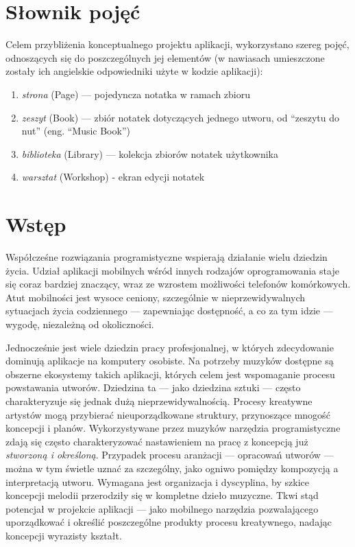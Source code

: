 \documentclass[12pt]{article}
\begin{document}

\newpage
\clearpage
\tableofcontents


\newpage
{}
\section*{Słownik pojęć}
Celem przybliżenia konceptualnego projektu aplikacji, wykorzystano szereg pojęć, odnoszących się do poszczególnych jej
elementów (w nawiasach umieszczone zostały ich angielskie odpowiedniki użyte w kodzie aplikacji):
\begin{enumerate}
	\item \textit{strona} (Page) — pojedyncza notatka w ramach zbioru
	\item \textit{zeszyt} (Book) — zbiór notatek dotyczących jednego utworu, od \enquote{zeszytu do nut} (eng. \enquote{Music Book})
	\item \textit{biblioteka} (Library) — kolekcja zbiorów notatek użytkownika
	\item \textit{warsztat} (Workshop) - ekran edycji notatek
\end{enumerate}

\newpage
{}
\section*{Wstęp}
Współcześne rozwiązania programistyczne wspierają działanie wielu dziedzin życia.
Udział aplikacji mobilnych wśród innych rodzajów oprogramowania staje się coraz bardziej znaczący,
wraz ze wzrostem możliwości telefonów komórkowych.
Atut mobilności jest wysoce ceniony, szczególnie w nieprzewidywalnych sytuacjach życia codziennego
— zapewniając dostępność, a co za tym idzie — wygodę, niezależną od okoliczności.

Jednocześnie jest wiele dziedzin pracy profesjonalnej, w których zdecydowanie dominują aplikacje na komputery osobiste.
Na potrzeby muzyków dostępne są obszerne ekosystemy takich aplikacji, których celem jest wspomaganie procesu powstawania utworów.
Dziedzina ta — jako dziedzina sztuki — często charakteryzuje się jednak dużą nieprzewidywalnością.
Procesy kreatywne artystów mogą przybierać nieuporządkowane struktury, przynoszące mnogość koncepcji i planów.
Wykorzystywane przez muzyków narzędzia programistyczne zdają się często charakteryzować nastawieniem na pracę
z koncepcją już \textit{stworzoną i określoną}.
Przypadek procesu aranżacji — opracowań utworów — można w tym świetle uznać za szczególny, jako ogniwo pomiędzy kompozycją
a interpretacją utworu. Wymagana jest organizacja i dyscyplina, by szkice koncepcji melodii przerodziły się w kompletne
dzieło muzyczne. Tkwi stąd potencjał w projekcie aplikacji — jako mobilnego narzędzia pozwalającego uporządkować i określić
poszczególne produkty procesu kreatywnego, nadając koncepcji wyrazisty kształt.
\end{document}
